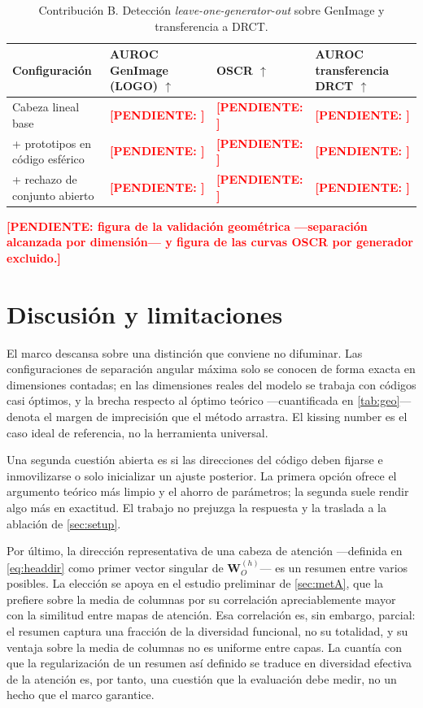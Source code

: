 \documentclass[11pt,a4paper]{article}
\theoremstyle{plain}
\newcommand{\todo}[1]{\textcolor{red}{\textbf{[PENDIENTE: #1]}}}
\begin{document}
\begin{table}[h]
\centering
\caption{Contribución B. Detección \emph{leave-one-generator-out} sobre
GenImage y transferencia a DRCT.}
\label{tab:detect}
\begin{tabularx}{0.96\linewidth}{X Y Y Y}
\toprule
Configuración & AUROC GenImage (LOGO) $\uparrow$ &
OSCR $\uparrow$ & AUROC transferencia DRCT $\uparrow$ \\
\midrule
Cabeza lineal base                 & \todo{} & \todo{} & \todo{} \\
+ prototipos en código esférico    & \todo{} & \todo{} & \todo{} \\
+ rechazo de conjunto abierto      & \todo{} & \todo{} & \todo{} \\
\bottomrule
\end{tabularx}
\end{table}

\todo{figura de la validación geométrica ---separación alcanzada por
dimensión--- y figura de las curvas OSCR por generador excluido.}

\section{Discusión y limitaciones}
\label{sec:discussion}

El marco descansa sobre una distinción que conviene no difuminar. Las
configuraciones de separación angular máxima solo se conocen de forma
exacta en dimensiones contadas; en las dimensiones reales del modelo se
trabaja con códigos casi óptimos, y la brecha respecto al óptimo
teórico ---cuantificada en \cref{tab:geo}--- denota el margen de
imprecisión que el método arrastra. El kissing number es el caso ideal
de referencia, no la herramienta universal.

Una segunda cuestión abierta es si las direcciones del código deben
fijarse e inmovilizarse o solo inicializar un ajuste posterior. La
primera opción ofrece el argumento teórico más limpio y el ahorro de
parámetros; la segunda suele rendir algo más en exactitud. El trabajo no
prejuzga la respuesta y la traslada a la ablación de \cref{sec:setup}.

Por último, la dirección representativa de una cabeza de atención
---definida en \cref{eq:headdir} como primer vector singular de
$\bm{W}_O^{(h)}$--- es un resumen entre varios posibles. La elección se
apoya en el estudio preliminar de \cref{sec:metA}, que la prefiere
sobre la media de columnas por su correlación apreciablemente mayor con
la similitud entre mapas de atención. Esa correlación es, sin embargo,
parcial: el resumen captura una fracción de la diversidad funcional, no
su totalidad, y su ventaja sobre la media de columnas no es uniforme
entre capas. La cuantía con que la regularización de un resumen así
definido se traduce en diversidad efectiva de la atención es, por
tanto, una cuestión que la evaluación debe medir, no un hecho que el
marco garantice.
\end{document}
